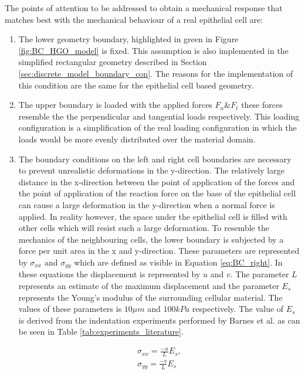 \qquad The points of attention to be addressed to obtain a mechanical response that matches best with the mechanical behaviour of a real epithelial cell are:
\begin{enumerate}
    \item The lower geometry boundary, highlighted in green in Figure \ref{fig:BC_HGO_model} is fixed. This assumption is also implemented in the simplified rectangular geometry described in Section \ref{sec:discrete_model_boundary_con}. The reasons for the implementation of this condition are the same for the epithelial cell based geometry. %
    \item The upper boundary is loaded with the applied forces $F_{n} \& F_{t}$ these forces resemble the  the perpendicular and tangential loads respectively. This loading configuration is a simplification of the real loading configuration in which the loads would be more evenly distributed over the material domain. %
    \item The boundary conditions on the left and right cell boundaries are necessary to prevent unrealistic deformations in the y-direction. The relatively large distance in the x-direction between the point of application of the forces and the point of application of the reaction force on the base of the epithelial cell can cause a large deformation in the y-direction when a normal force is applied. In reality however, the space under the epithelial cell is filled with other cells which will resist such a large deformation. To resemble the mechanics of the neighbouring cells, the lower boundary is subjected by a force per unit area in the x and y-direction. These parameters are represented by $\sigma_{xx}$ and $\sigma_{yy}$ which are defined as visible in Equation \ref{eq:BC_right}. In these equations the displacement is represented by $u$ and $v$. The parameter $L$ represents an estimate of the maximum displacement and the parameter $E_s$ represents the Young's modulus of the surrounding cellular material. The values of these parameters is $10 \mu m$ and $100 kPa$ respectively. The value of $E_s$ is derived from the indentation experiments performed by Barnes et al. as can be seen in Table \ref{tab:experiments_literature}. %
    
    \begin{gather}
        \sigma_{xx} = \frac{-u}{L} E_{s},\nonumber\\
        \sigma_{yy} = \frac{-v}{L} E_{s}
        \label{eq:BC_right}
    \end{gather}
    

\end{enumerate}
